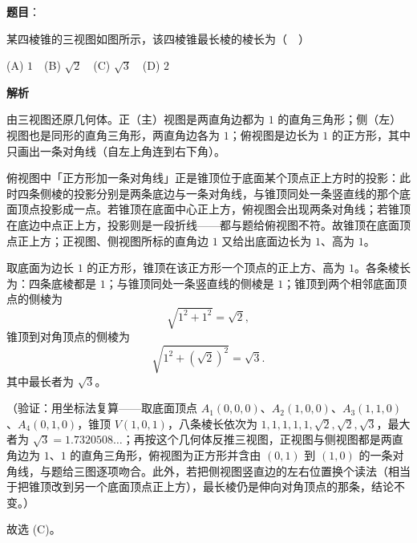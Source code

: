 \begin{answer}

\textbf{题目}：

某四棱锥的三视图如图所示，该四棱锥最长棱的棱长为（　）
\nopagebreak[4]
\begin{center}\end{center}
\nopagebreak[4]
(A) \(1\)　(B) \(\sqrt{2}\)　(C) \(\sqrt{3}\)　(D) \(2\)

\textbf{解析}

由三视图还原几何体。正（主）视图是两直角边都为 \(1\) 的直角三角形；侧（左）视图也是同形的直角三角形，两直角边各为 \(1\)；俯视图是边长为 \(1\) 的正方形，其中只画出一条对角线（自左上角连到右下角）。

俯视图中「正方形加一条对角线」正是锥顶位于底面某个顶点正上方时的投影：此时四条侧棱的投影分别是两条底边与一条对角线，与锥顶同处一条竖直线的那个底面顶点投影成一点。若锥顶在底面中心正上方，俯视图会出现两条对角线；若锥顶在底边中点正上方，投影则是一段折线——都与题给俯视图不符。故锥顶在底面顶点正上方；正视图、侧视图所标的直角边 \(1\) 又给出底面边长为 \(1\)、高为 \(1\)。

取底面为边长 \(1\) 的正方形，锥顶在该正方形一个顶点的正上方、高为 \(1\)。各条棱长为：四条底棱都是 \(1\)；与锥顶同处一条竖直线的侧棱是 \(1\)；锥顶到两个相邻底面顶点的侧棱为
\nopagebreak[4]
\[
\sqrt{1^{2}+1^{2}}=\sqrt{2},
\]
锥顶到对角顶点的侧棱为
\nopagebreak[4]
\[
\sqrt{1^{2}+(\sqrt{2})^{2}}=\sqrt{3}.
\]
其中最长者为 \(\sqrt{3}\)。

（验证：用坐标法复算——取底面顶点 \(A_{1}(0,0,0)\)、\(A_{2}(1,0,0)\)、\(A_{3}(1,1,0)\)、\(A_{4}(0,1,0)\)，锥顶 \(V(1,0,1)\)，八条棱长依次为 \(1,1,1,1,1,\sqrt{2},\sqrt{2},\sqrt{3}\)，最大者为 \(\sqrt{3}=1.7320508\ldots\)；再按这个几何体反推三视图，正视图与侧视图都是两直角边为 \(1\)、\(1\) 的直角三角形，俯视图为正方形并含由 \((0,1)\) 到 \((1,0)\) 的一条对角线，与题给三图逐项吻合。此外，若把侧视图竖直边的左右位置换个读法（相当于把锥顶改到另一个底面顶点正上方），最长棱仍是伸向对角顶点的那条，结论不变。）

故选 (C)。


\end{answer}
